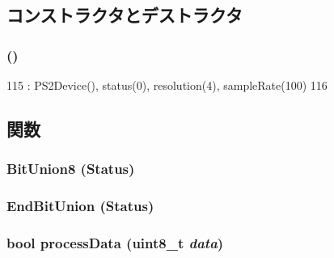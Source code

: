 \subsection{コンストラクタとデストラクタ}
\hypertarget{classX86ISA_1_1PS2Mouse_a7445002f3bb5ca2ff1fbacb583d8d4b6}{
\subsubsection[{PS2Mouse}]{ ()}}
\label{classX86ISA_1_1PS2Mouse_a7445002f3bb5ca2ff1fbacb583d8d4b6}



\begin{DoxyCode}
115                : PS2Device(), status(0), resolution(4), sampleRate(100)
116     {}
\end{DoxyCode}


\subsection{関数}
\hypertarget{classX86ISA_1_1PS2Mouse_ad5a62dd93ada43b5048b0d9ddfc8b076}{
\subsubsection[{BitUnion8}]{\setlength{\rightskip}{0pt plus 5cm}BitUnion8 (Status)}}
\label{classX86ISA_1_1PS2Mouse_ad5a62dd93ada43b5048b0d9ddfc8b076}
\hypertarget{classX86ISA_1_1PS2Mouse_a716a44dd9c10b22cacb46491ae3e525a}{
\subsubsection[{EndBitUnion}]{\setlength{\rightskip}{0pt plus 5cm}EndBitUnion (Status)}}
\label{classX86ISA_1_1PS2Mouse_a716a44dd9c10b22cacb46491ae3e525a}
\hypertarget{classX86ISA_1_1PS2Mouse_a501fdeaf8d614f432cfbf95f23675982}{
\subsubsection[{processData}]{\setlength{\rightskip}{0pt plus 5cm}bool processData (uint8\_\-t {\em data})}}
\label{classX86ISA_1_1PS2Mouse_a501fdeaf8d614f432cfbf95f23675982}


